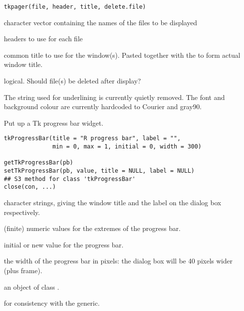 %
\begin{Usage}
\begin{verbatim}
tkpager(file, header, title, delete.file)
\end{verbatim}
\end{Usage}
%
\begin{Arguments}
\begin{ldescription}
\item[\code{file}] character vector containing the names of the
files to be displayed
\item[\code{header}] headers to use for each file
\item[\code{title}] common title to use for the window(s). Pasted together
with the  to form actual window title.
\item[\code{delete.file}] logical. Should file(s) be deleted after display?
\end{ldescription}
\end{Arguments}
%
\begin{Note}\relax
  The  string used for underlining is currently
quietly removed. The font and background colour are currently
hardcoded to Courier and gray90.
\end{Note}
%
\begin{SeeAlso}\relax
{}
\end{SeeAlso}
%
\begin{Description}\relax
Put up a Tk progress bar widget.
\end{Description}
%
\begin{Usage}
\begin{verbatim}
tkProgressBar(title = "R progress bar", label = "",
              min = 0, max = 1, initial = 0, width = 300)

getTkProgressBar(pb)
setTkProgressBar(pb, value, title = NULL, label = NULL)
## S3 method for class 'tkProgressBar'
close(con, ...)
\end{verbatim}
\end{Usage}
%
\begin{Arguments}
\begin{ldescription}
\item[\code{title, label}] character strings, giving the window title and the
label on the dialog box respectively.
\item[\code{min, max}] (finite) numeric values for the extremes of the
progress bar.
\item[\code{initial, value}] initial or new value for the progress bar.
\item[\code{width}] the width of the progress bar in pixels: the dialog box
will be 40 pixels wider (plus frame).
\item[\code{pb, con}] an object of class .
\item[\code{...}] for consistency with the generic.
\end{ldescription}
\end{Arguments}

